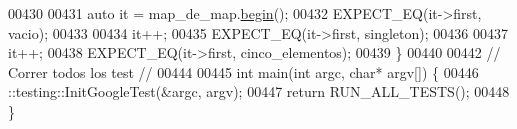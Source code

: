 \begin{DoxyCode}
00430 
00431     \textcolor{keyword}{auto} it = map\_de\_map.\hyperlink{classaed2_1_1map_a58a95705d54b3dda7f775ce5a22225cb_a58a95705d54b3dda7f775ce5a22225cb}{begin}();
00432     EXPECT\_EQ(it->first, vacio);
00433 
00434     it++;
00435     EXPECT\_EQ(it->first, singleton);
00436 
00437     it++;
00438     EXPECT\_EQ(it->first, cinco\_elementos);
00439 \}
00440 
00442 \textcolor{comment}{// Correr todos los test //}
00444 \textcolor{comment}{}
00445 \textcolor{keywordtype}{int} main(\textcolor{keywordtype}{int} argc, \textcolor{keywordtype}{char}* argv[]) \{
00446     ::testing::InitGoogleTest(&argc, argv);
00447   \textcolor{keywordflow}{return} RUN\_ALL\_TESTS();
00448 \}
\end{DoxyCode}
